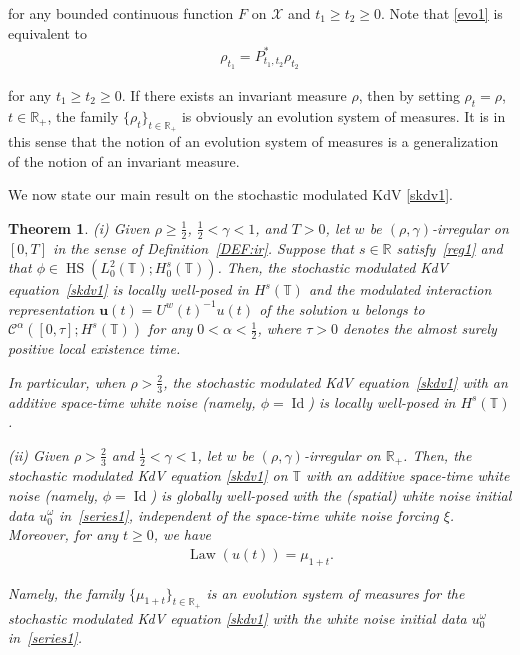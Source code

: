 \documentclass[letterpaper, 11pt,  reqno]{amsart}
\newtheorem{theorem}{Theorem} [section]
\DeclareMathOperator{\HS}{HS}
\DeclareMathOperator{\Id}{Id}
\DeclareMathOperator{\Law}{Law}
\newcommand{\1}{\hspace{0.5mm}\text{I}\hspace{0.5mm}}
\newcommand{\noi}{\noindent}
\newcommand{\R}{\mathbb{R}}
\newcommand{\T}{\mathbb{T}}
\newcommand{\al}{\alpha}
\newcommand{\g}{\gamma}
\renewcommand{\o}{\omega}
\newcommand{\cC}{\mathcal{C}}
\newcommand{\uw}{U^w}
\newcommand{\uu}{\mathbf{u}}
\numberwithin{equation}{section}
\numberwithin{theorem}{section}
\begin{document}
\noi
for any bounded continuous function $F$ on $\mathcal{X}$ and $t_1 \ge t_2 \ge 0$.
Note that \eqref{evo1} is equivalent to 
\begin{align}
 \rho_{t_1} = P^*_{t_1, t_2} \rho_{t_2} 
 \label{evo2}
\end{align}

\noi
for any $t_1 \ge t_2 \ge 0$.
If there exists an invariant measure $\rho$, 
then by setting $\rho_t = \rho$, $t \in \R_+$, 
the family $\{\rho_t\}_{t\in \R_+}$ is obviously
an evolution system of measures.
It is in this sense that the notion of an evolution system
of measures is a generalization of the notion of an invariant measure.


We now state our main result on the stochastic modulated KdV \eqref{skdv1}.

\begin{theorem}\label{THM:skdv1}
\noi
\textup{(i)}
Given $\rho \ge\frac 12$,  $\frac12< \g < 1$, and $T> 0$, 
let  $w$ be $(\rho,\g)$-irregular on $[0, T]$ in the sense of Definition~\ref{DEF:ir}.
Suppose that  $s \in \R$ satisfy~\eqref{reg1}
and that $\phi \in \HS(L^2_0(\T); H^s_0(\T))$.
Then, 
 the stochastic modulated KdV equation~\eqref{skdv1}
is locally well-posed in $H^s(\T)$
and the modulated interaction representation $\uu(t) = \uw(t)^{-1}u(t)$
of the solution $u$
belongs to 
$\cC^\al([0, \tau]; H^s(\T))$
for any $ 0 < \al < \frac 12$, 
where $\tau > 0$ denotes the almost surely positive local existence time.


In particular, when $\rho > \frac 23$, 
 the stochastic modulated KdV equation~\eqref{skdv1}
 with an additive space-time white noise \textup{(}namely, $\phi = \Id$\textup{)}
is locally well-posed in $H^s(\T)$.


\smallskip


\noi
\textup{(ii)}
Given $\rho > \frac 23$ and   $\frac12< \g < 1$, 
let  $w$ be $(\rho,\g)$-irregular on $\R_+$.
Then, 
the stochastic modulated KdV equation \eqref{skdv1}
on $\T$
 with an additive space-time white noise
 \textup{(}namely, $\phi = \Id$\textup{)}
 is globally well-posed with 
 the  \textup{(}spatial\textup{)}
 white noise initial data $u_0^\o$ in~\eqref{series1}, 
 independent of the space-time white noise forcing  $\xi$.
   Moreover, for any $t\ge 0$, 
 we have
\begin{align}
\Law (u(t)) = \mu_{1+t}.
\label{th1}
\end{align}

\noi
Namely,  the family  $\{ \mu_{1+t}\}_{t\in \R_+}$
is an evolution system of measures
for the stochastic modulated KdV equation  \eqref{skdv1} with the white noise initial data $u_0^\o$ in~\eqref{series1}.

\end{theorem}
\end{document}
